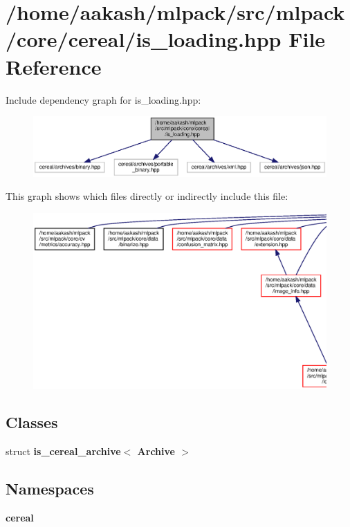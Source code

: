 \section{/home/aakash/mlpack/src/mlpack/core/cereal/is\+\_\+loading.hpp File Reference}
\label{is__loading_8hpp}
Include dependency graph for is\+\_\+loading.\+hpp\+:
\nopagebreak
\begin{figure}[H]
\begin{center}
\leavevmode
\includegraphics[width=350pt]{is__loading_8hpp__incl}
\end{center}
\end{figure}
This graph shows which files directly or indirectly include this file\+:
\nopagebreak
\begin{figure}[H]
\begin{center}
\leavevmode
\includegraphics[width=350pt]{is__loading_8hpp__dep__incl}
\end{center}
\end{figure}
\subsection*{Classes}
\begin{DoxyCompactItemize}
\item 
struct \textbf{ is\+\_\+cereal\+\_\+archive$<$ Archive $>$}
\end{DoxyCompactItemize}
\subsection*{Namespaces}
\begin{DoxyCompactItemize}
\item 
 \textbf{ cereal}
\end{DoxyCompactItemize}

